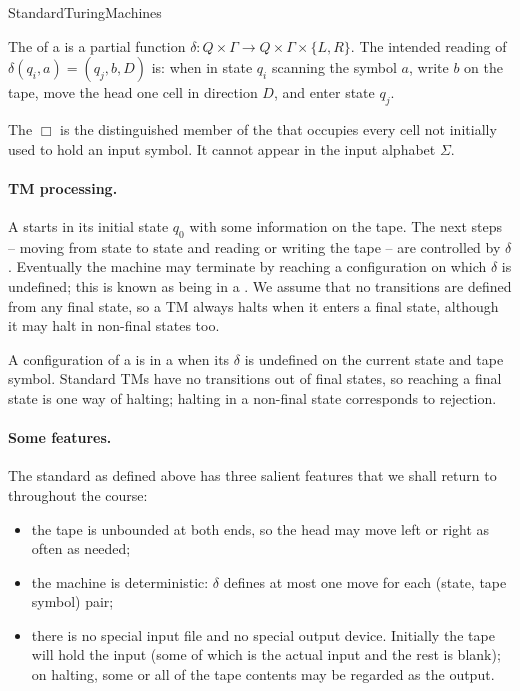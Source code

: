 \documentclass[hidelinks]{article}
\begin{document}
\begin{smodule}[title={Standard Turing Machines}]{StandardTuringMachines}
\begin{sdefinition}[for=transition function]
The  of a  is a partial function $\delta : Q \times \Gamma \to Q \times \Gamma \times \{L, R\}$. The intended reading of $\delta(q_i, a) = (q_j, b, D)$ is: when in state $q_i$ scanning the symbol $a$, write $b$ on the tape, move the head one cell in direction $D$, and enter state $q_j$.
\end{sdefinition}

\begin{sdefinition}[for=blank symbol]
The  $\Box$ is the distinguished member of the  that occupies every cell not initially used to hold an input symbol. It cannot appear in the input alphabet $\Sigma$.
\end{sdefinition}

\paragraph{TM processing.} A  starts in its initial state $q_0$ with some information on the tape. The next steps -- moving from state to state and reading or writing the tape -- are controlled by $\delta$. Eventually the machine may terminate by reaching a configuration on which $\delta$ is undefined; this is known as being in a . We assume that no transitions are defined from any final state, so a TM always halts when it enters a final state, although it may halt in non-final states too.

\begin{sdefinition}[for=halt state]
A configuration of a  is in a  when its  $\delta$ is undefined on the current state and tape symbol. Standard TMs have no transitions out of final states, so reaching a final state is one way of halting; halting in a non-final state corresponds to rejection.
\end{sdefinition}

\paragraph{Some features.} The standard  as defined above has three salient features that we shall return to throughout the course:
\begin{itemize}
  \item the tape is unbounded at both ends, so the head may move left or right as often as needed;
  \item the machine is deterministic: $\delta$ defines at most one move for each (state, tape symbol) pair;
  \item there is no special input file and no special output device. Initially the tape will hold the input (some of which is the actual input and the rest is blank); on halting, some or all of the tape contents may be regarded as the output.
\end{itemize}


\end{smodule}
\end{document}
